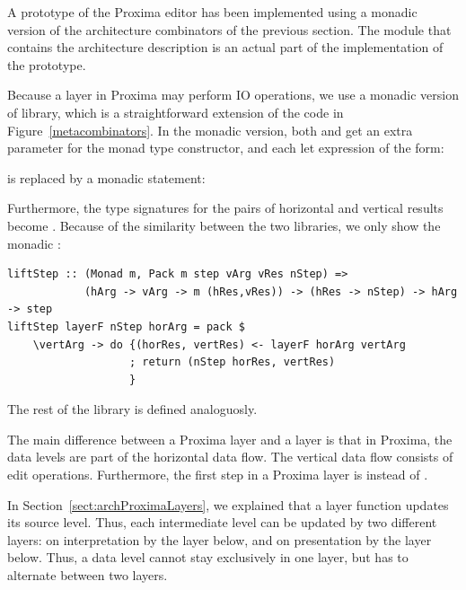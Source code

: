 \documentclass[preprint,natbib]{sigplanconf}
\begin{document}

A prototype of the Proxima editor has been implemented using a monadic version of the architecture combinators of the previous section. The module that contains the architecture description is an actual part of the implementation of the prototype.


Because a layer in Proxima may perform IO operations, we use a monadic version of library, which is a straightforward extension of the code in Figure~\ref{metacombinators}. In the monadic version, both  and  get an extra parameter  for the monad type constructor, and each let expression of the  form:


is replaced by a monadic statement:


Furthermore, the type signatures for the pairs of horizontal and vertical results  become . Because of the similarity between the two libraries, we only show the monadic :

\begin{small}
\begin{verbatim}
liftStep :: (Monad m, Pack m step vArg vRes nStep) => 
            (hArg -> vArg -> m (hRes,vRes)) -> (hRes -> nStep) -> hArg -> step
liftStep layerF nStep horArg = pack $ 
    \vertArg -> do {(horRes, vertRes) <- layerF horArg vertArg
                   ; return (nStep horRes, vertRes)
                   }
\end{verbatim}
\end{small}%

The rest of the library is defined analoguosly.


The main difference between a Proxima layer and a  layer is that in Proxima, the data levels are part of the horizontal data flow. The vertical data flow consists of edit operations. Furthermore, the first step in a Proxima layer is  instead of .

In Section~\ref{sect:archProximaLayers}, we explained that a layer function updates its source level. Thus, each intermediate level can be updated by two different layers: on interpretation by the layer below, and on presentation by the layer below. Thus, a data level cannot stay exclusively in one layer, but has to alternate between two layers.
\end{document}
